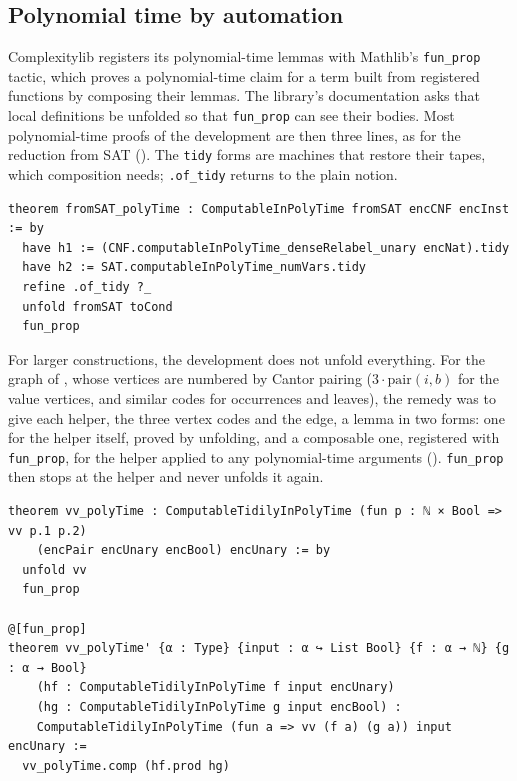 \documentclass[pdflatex,sn-mathphys-num]{sn-jnl}
\theoremstyle{thmstyleone}
\theoremstyle{thmstylethree}
\begin{document}
\subsection{Polynomial time by automation}
\label{sec:funprop}

Complexitylib registers its polynomial-time lemmas with Mathlib's \lstinline{fun_prop} tactic,
which proves a polynomial-time claim for a term built from registered functions by composing
their lemmas. The library's documentation asks that local definitions be unfolded so that
\lstinline{fun_prop} can see their bodies. Most polynomial-time proofs of the development are
then three lines, as for the reduction from SAT (). The \lstinline{tidy}
forms are machines that restore their tapes, which composition needs; \lstinline{.of_tidy}
returns to the plain notion.

\begin{lstlisting}[float=t,caption={The polynomial time of the SAT reduction (\texttt{General.lean}). The two \texttt{have} lines bring library lemmas for the dense relabelling and the number of variables into the context; \texttt{fun\_prop} composes them with the lemmas for pairs, lists, \texttt{replicate}, \texttt{map} and \texttt{if}.},label={lst:fromsat}]
theorem fromSAT_polyTime : ComputableInPolyTime fromSAT encCNF encInst := by
  have h1 := (CNF.computableInPolyTime_denseRelabel_unary encNat).tidy
  have h2 := SAT.computableInPolyTime_numVars.tidy
  refine .of_tidy ?_
  unfold fromSAT toCond
  fun_prop
\end{lstlisting}

For larger constructions, the development does not unfold everything. For the graph of , whose vertices are
numbered by Cantor pairing ($3\cdot\mathrm{pair}(i,b)$ for the value vertices, and similar codes
for occurrences and leaves), the remedy was to give each helper, the three vertex codes and the edge, a lemma
in two forms: one for the helper itself, proved by unfolding, and a composable one, registered
with \lstinline{fun_prop}, for the helper applied to any polynomial-time arguments
(). \lstinline{fun_prop} then stops at the helper and never unfolds it again.

\begin{lstlisting}[float=t,caption={A helper with its composable lemma (\texttt{Valiant/Gadget.lean}). The attribute \texttt{@[fun\_prop]} registers the second theorem, so that \texttt{fun\_prop} treats \texttt{vv} as a primitive.},label={lst:vv}]
theorem vv_polyTime : ComputableTidilyInPolyTime (fun p : ℕ × Bool => vv p.1 p.2)
    (encPair encUnary encBool) encUnary := by
  unfold vv
  fun_prop

@[fun_prop]
theorem vv_polyTime' {α : Type} {input : α ↪ List Bool} {f : α → ℕ} {g : α → Bool}
    (hf : ComputableTidilyInPolyTime f input encUnary)
    (hg : ComputableTidilyInPolyTime g input encBool) :
    ComputableTidilyInPolyTime (fun a => vv (f a) (g a)) input encUnary :=
  vv_polyTime.comp (hf.prod hg)
\end{lstlisting}
\end{document}
